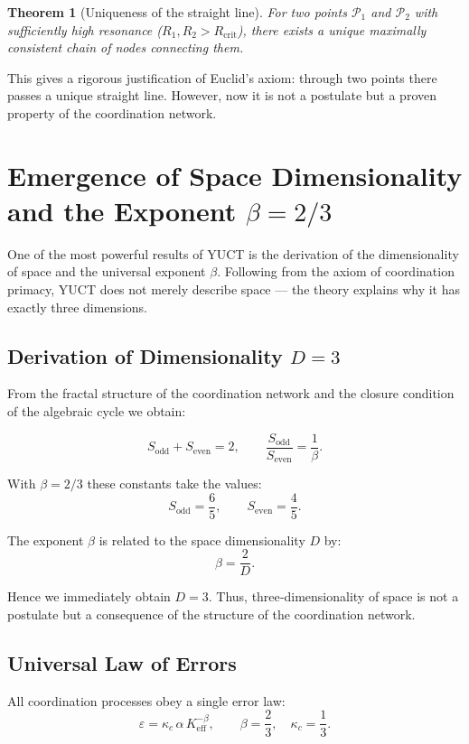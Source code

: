 \documentclass[12pt,a4paper]{article}
\newtheorem{theorem}{Theorem}
\newcommand{\Keff}{K_{\mathrm{eff}}}
\newcommand{\kappac}{\kappa_c}
\newcommand{\eps}{\varepsilon}
\newcommand{\betaf}{\beta}
\newcommand{\Sodd}{S_{\mathrm{odd}}}
\newcommand{\Seven}{S_{\mathrm{even}}}
\newcommand{\Rcrit}{R_{\mathrm{crit}}}
\newcommand{\calP}{\mathcal{P}}
\begin{document}
	\begin{theorem}[Uniqueness of the straight line]
		For two points \(\calP_1\) and \(\calP_2\) with sufficiently high resonance (\(R_1, R_2 > \Rcrit\)), there exists a unique maximally consistent chain of nodes connecting them.
	\end{theorem}
	
	This gives a rigorous justification of Euclid's axiom: through two points there passes a unique straight line. However, now it is not a postulate but a proven property of the coordination network.
	
	\section{Emergence of Space Dimensionality and the Exponent \(\betaf = 2/3\)}
	
	One of the most powerful results of YUCT is the derivation of the dimensionality of space and the universal exponent \(\betaf\). Following from the axiom of coordination primacy, YUCT does not merely describe space — the theory explains why it has exactly three dimensions.
	
	\subsection{Derivation of Dimensionality \(D=3\)}
	
	From the fractal structure of the coordination network and the closure condition of the algebraic cycle we obtain:
	
	\[
	\Sodd + \Seven = 2, \qquad \frac{\Sodd}{\Seven} = \frac{1}{\betaf}.
	\]
	
	With \(\betaf = 2/3\) these constants take the values:
	\[
	\Sodd = \frac{6}{5}, \qquad \Seven = \frac{4}{5}.
	\]
	
	The exponent \(\betaf\) is related to the space dimensionality \(D\) by:
	\[
	\betaf = \frac{2}{D}.
	\]
	
	Hence we immediately obtain \(D = 3\). Thus, three‑dimensionality of space is not a postulate but a consequence of the structure of the coordination network.
	
	\subsection{Universal Law of Errors}
	
	All coordination processes obey a single error law:
	\[
	\eps = \kappac\,\alpha\,\Keff^{-\betaf}, \qquad \betaf = \frac{2}{3}, \quad \kappac = \frac{1}{3}.
	\]
	
\end{document}
